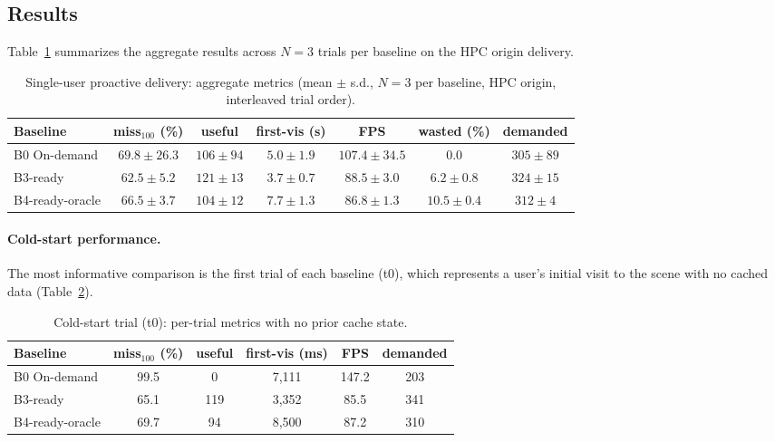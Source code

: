 \subsection{Results}

Table~\ref{tab:v2-aggregate} summarizes the aggregate results across $N=3$
trials per baseline on the HPC origin delivery.

\begin{table}[t]
\centering
\caption{Single-user proactive delivery: aggregate metrics (mean $\pm$ s.d.,
$N=3$ per baseline, HPC origin, interleaved trial order).}
\label{tab:v2-aggregate}
\begin{tabular}{lcccccc}
\hline
Baseline & miss$_{100}$ (\%) & useful & first-vis (s) & FPS & wasted (\%) & demanded \\
\hline
B0 On-demand      & $69.8 \pm 26.3$ & $106 \pm 94$ & $5.0 \pm 1.9$ & $107.4 \pm 34.5$ & $0.0$ & $305 \pm 89$ \\
B3-ready          & $62.5 \pm 5.2$  & $121 \pm 13$ & $3.7 \pm 0.7$ & $88.5 \pm 3.0$   & $6.2 \pm 0.8$ & $324 \pm 15$ \\
B4-ready-oracle   & $66.5 \pm 3.7$  & $104 \pm 12$ & $7.7 \pm 1.3$ & $86.8 \pm 1.3$   & $10.5 \pm 0.4$ & $312 \pm 4$ \\
\hline
\end{tabular}
\end{table}

\paragraph{Cold-start performance.}
The most informative comparison is the first trial of each baseline (t0),
which represents a user's initial visit to the scene with no cached data
(Table~\ref{tab:v2-coldstart}).

\begin{table}[t]
\centering
\caption{Cold-start trial (t0): per-trial metrics with no prior cache state.}
\label{tab:v2-coldstart}
\begin{tabular}{lccccc}
\hline
Baseline & miss$_{100}$ (\%) & useful & first-vis (ms) & FPS & demanded \\
\hline
B0 On-demand    & 99.5 & 0   & 7{,}111 & 147.2 & 203 \\
B3-ready        & 65.1 & 119 & 3{,}352 & 85.5  & 341 \\
B4-ready-oracle & 69.7 & 94  & 8{,}500 & 87.2  & 310 \\
\hline
\end{tabular}
\end{table}

